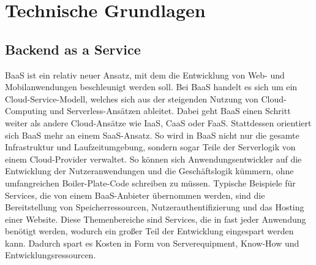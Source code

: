 \section{Technische Grundlagen}

\subsection{Backend as a Service}
\ac{BaaS} ist ein relativ neuer Ansatz, mit dem die Entwicklung von Web- und Mobilanwendungen beschleunigt werden soll.
Bei \ac{BaaS} handelt es sich um ein Cloud-Service-Modell, welches sich aus der steigenden Nutzung von Cloud-Computing und Serverless-Ansätzen ableitet.
Dabei geht \ac{BaaS} einen Schritt weiter als andere Cloud-Ansätze wie \ac{IaaS}, \ac{CaaS} oder \ac{FaaS}.
Stattdessen orientiert sich \ac{BaaS} mehr an einem \ac{SaaS}-Ansatz. %
So wird in \ac{BaaS} nicht nur die gesamte Infrastruktur und Laufzeitumgebung, sondern sogar Teile der Serverlogik von einem Cloud-Provider verwaltet.\autocite[Vgl.][]{cloudflareBaaS}
So können sich Anwendungsentwickler auf die Entwicklung der Nutzeranwendungen und die Geschäftslogik kümmern, ohne umfangreichen Boiler-Plate-Code schreiben zu müssen.
Typische Beispiele für Services, die von einem \ac{BaaS}-Anbieter übernommen werden, sind die Bereitstellung von Speicherressourcen, Nutzerauthentifizierung und das Hosting einer Website.
Diese Themenbereiche sind Services, die in fast jeder Anwendung benötigt werden, wodurch ein großer Teil der Entwicklung eingespart werden kann.
Dadurch spart es Kosten in Form von Serverequipment, Know-How und Entwicklungsressourcen.


